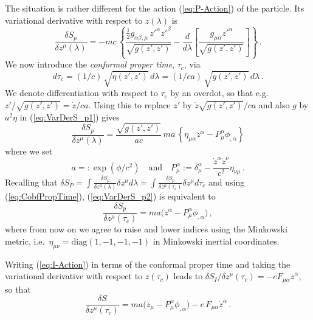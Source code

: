 \documentclass
[rmp,aps,twocolumn,showpacs,preprintnumbers,amsmath,amssymb]{revtex4}
\theoremstyle{plain}
\theoremstyle{definition}
\theoremstyle{remark}
\begin{document}
The situation is rather different for the action (\ref{eq:P-Action})
of the particle.  Its variational derivative with respect to
$z(\lambda)$ is 
%
\begin{equation}\label{eq:VarDerS_p1}
  \frac{\delta S_p}{\delta z^\mu(\lambda)}= -mc\,\left\{
  \frac{\tfrac{1}{2}g_{\alpha\beta,\mu}\,z'^\alpha z'^\beta}{\sqrt{g(z',z')}} 
 -\frac{d}{d\lambda}\left[\frac{g_{\mu\alpha}z'^\alpha}{\sqrt{g(z',z')}}
  \right]\right\} \, .
\end{equation} 
%
We now introduce the \emph{conformal proper time}, $\tau_c$, via 
%
\begin{equation}\label{eq:CobfPropTime}
  d\tau_c = (1/c)\,\sqrt{\eta(z',z')}\,d\lambda
          = (1/ca)\,\sqrt{g(z',z')}\,d\lambda\,.
\end{equation}
%
We denote differentiation with respect to $\tau_c$ by an overdot, 
so that e.g.~$z'/\sqrt{g(z',z')}=\dot z/ca$. Using this to replace 
$z'$ by $\dot z\sqrt{g(z',z')}/ca$ and also $g$ by $a^2\eta$ in 
(\ref{eq:VarDerS_p1}) gives 
%
\begin{equation}\label{eq:VarDerS_p2}
  \frac{\delta S_p}{\delta z^\mu(\lambda)}= 
  \frac{\sqrt{g(z',z')}}{ac}\,ma\,\left\{
  \eta_{\mu\alpha}\ddot z^\alpha - P^\alpha_\mu\phi_{,\alpha}\right\}
\end{equation} 
%
where we set 
%
\begin{equation}\label{eq:Abbrev}
  a=:\exp(\phi/c^2)\quad\text{and}
  \quad
  P^\alpha_\mu := \delta^\alpha_\mu - 
  \frac{\dot z^\alpha\dot z^\nu}{c^2}\eta_{\nu\mu}\,.
\end{equation}
%
Recalling that 
$\delta S_P=\int\frac{\delta S_p}{\delta z^\mu(\lambda)}\delta z^\mu d\lambda=
\int\frac{\delta S_p}{\delta z^\mu(\tau_c)}\delta z^\mu d\tau_c$ and 
using (\ref{eq:CobfPropTime}), (\ref{eq:VarDerS_p2}) is equivalent to 
%
\begin{equation}\label{eq:VarDerS_p3}
  \frac{\delta S_p}{\delta z^\mu(\tau_c)}= 
  ma\bigl(\ddot z^\alpha - P^\alpha_\mu\phi_{,\alpha}\bigr)\,,
  \end{equation} 
%
where from now on we agree to raise and lower indices using the 
Minkowski metric, i.e.~$\eta_{\mu\nu}=\text{diag}(1,-1,-1,-1)$ in Minkowski 
inertial coordinates.
 
Writing (\ref{eq:I-Action}) in terms of the conformal proper time 
and taking the variational derivative with respect to $z(\tau_c)$ 
leads to $\delta S_I/\delta z^\mu(\tau_c)=-eF_{\mu\alpha}{\dot z}^\alpha$, 
so that 
%
\begin{equation}\label{eq:VarDerSwrtZ}
  \frac{\delta S}{\delta z^\mu(\tau_c)}
  =ma\bigl(\ddot z_\mu - P^\alpha_\mu\phi_{,\alpha}\bigr)
  -e\,F_{\mu\alpha}{\dot z}^\alpha\,.
\end{equation}
%
\end{document}
